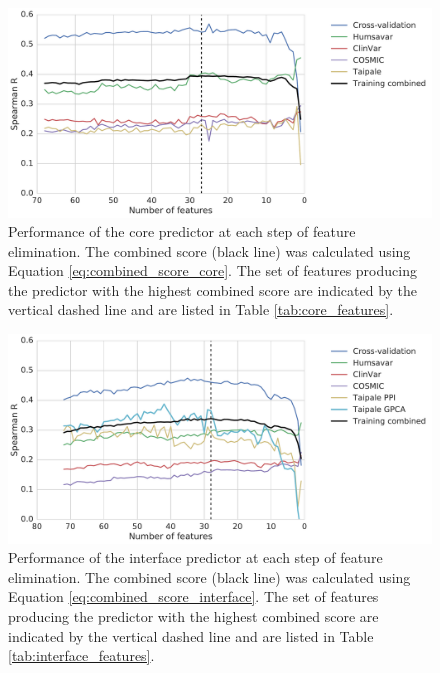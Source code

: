 
\begin{figure}[tb]
	\includegraphics[width=0.9\linewidth]{static/elaspic_training_set/machine_learning/feature_elimination_core.pdf}
	\caption[Core predictor feature elimination.]{
		Performance of the core predictor at each step of feature elimination.
		The combined score (black line) was calculated using Equation \ref{eq:combined_score_core}.
		The set of features producing the predictor with the highest combined score are indicated by the vertical dashed line and are listed in Table \ref{tab:core_features}.
	}
	\label{fig:feature_elimination_core}
\end{figure}

\begin{figure}[tb]
	\includegraphics[width=0.9\linewidth]{static/elaspic_training_set/machine_learning/feature_elimination_interface.pdf}
	\caption[Interface predictor feature elimination.]{
		Performance of the interface predictor at each step of feature elimination.
		The combined score (black line) was calculated using Equation \ref{eq:combined_score_interface}.
		The set of features producing the predictor with the highest combined score are indicated by the vertical dashed line and are listed in Table \ref{tab:interface_features}.
	}
	\label{fig:feature_elimination_interface}
\end{figure}

